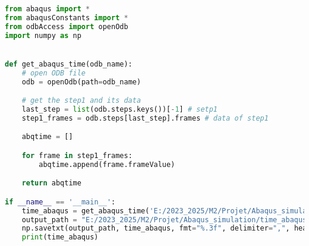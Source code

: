 \documentclass[12pt,a4paper]{article}
\begin{document}
\begin{lstlisting}[language=Python, caption={Code Python pour récupérer la grille de temps Abaqus}]
from abaqus import *
from abaqusConstants import *
from odbAccess import openOdb
import numpy as np


def get_abaqus_time(odb_name):
    # open ODB file
    odb = openOdb(path=odb_name)

    # get the step1 and its data
    last_step = list(odb.steps.keys())[-1] # setp1
    step1_frames = odb.steps[last_step].frames # data of step1

    abqtime = []

    for frame in step1_frames:
        abqtime.append(frame.frameValue)

    return abqtime

if __name__ == '__main__':
    time_abaqus = get_abaqus_time('E:/2023_2025/M2/Projet/Abaqus_simulation/traction.odb')
    output_path = "E:/2023_2025/M2/Projet/Abaqus_simulation/time_abaqus.csv"
    np.savetxt(output_path, time_abaqus, fmt="%.3f", delimiter=",", header="time", comments="")
    print(time_abaqus)
\end{lstlisting}
\end{document}
